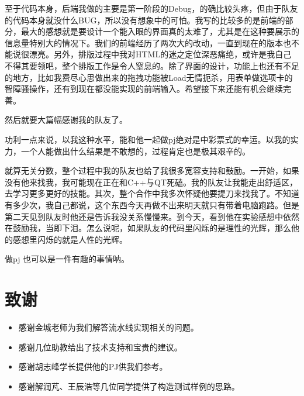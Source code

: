 \documentclass[12pt]{article} %
\begin{document}
\begin{sloppypar}
至于代码本身，后端我做的主要是第一阶段的Debug，的确比较头疼，但由于队友的代码本身就没什么BUG，所以没有想象中的可怕。我写的比较多的是前端的部分，最大的感想就是要设计一个能入眼的界面真的太难了，尤其是在这种要展示的信息量特别大的情况下。我们的前端经历了两次大的改动，一直到现在的版本也不能说很漂亮。另外，排版过程中我对HTML的迷之定位深恶痛绝，或许是我自己不得其要领吧，整个排版工作是令人窒息的。除了界面的设计，功能上也还有不足的地方，比如我费尽心思做出来的拖拽功能被Load无情扼杀，用表单做选项卡的智障骚操作，还有到现在都没能实现的前端输入。希望接下来还能有机会继续完善。

然后就要大篇幅感谢我的队友了。

功利一点来说，以我这种水平，能和他一起做pj绝对是中彩票式的幸运。以我的实力，一个人能做出什么结果是不敢想的，过程肯定也是极其艰辛的。

就算无关分数，整个过程中我的队友也给了我很多宽容支持和鼓励。一开始，如果没有他来找我，我可能现在正在和C++与QT死磕。我的队友让我能走出舒适区，去学习更多更好的技能。其次，整个合作中我多次怀疑他要提刀来找我了。不知道有多少次，我自己都说，这个东西今天再做不出来明天就只有带着电脑跑路。但是第二天见到队友时他还是告诉我没关系慢慢来。到今天，看到他在实验感想中依然在鼓励我，当即下泪。怎么说呢，如果队友的代码里闪烁的是理性的光辉，那么他的感想里闪烁的就是人性的光辉。

做pj 也可以是一件有趣的事情呐。

\clearpage
\section{致谢}

\begin{itemize}
\item 感谢金城老师为我们解答流水线实现相关的问题。
\item 感谢几位助教给出了技术支持和宝贵的建议。
\item 感谢胡志峰学长提供他的PJ供我们参考。
\item 感谢解润芃、王辰浩等几位同学提供了构造测试样例的思路。
\end{itemize}


\end{sloppypar}
\end{document}
